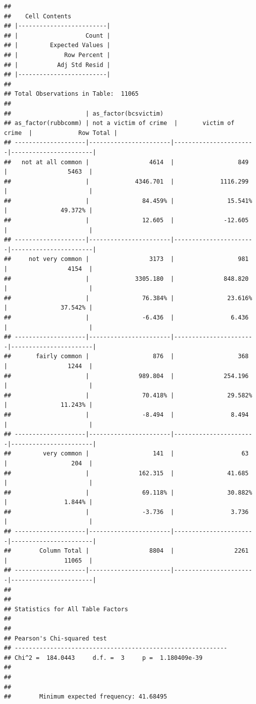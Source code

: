\documentclass[
]{book}
\begin{document}
\begin{verbatim}
## 
##    Cell Contents
## |-------------------------|
## |                   Count |
## |         Expected Values |
## |             Row Percent |
## |           Adj Std Resid |
## |-------------------------|
## 
## Total Observations in Table:  11065 
## 
##                     | as_factor(bcsvictim) 
## as_factor(rubbcomm) | not a victim of crime  |       victim of crime  |             Row Total | 
## --------------------|-----------------------|-----------------------|-----------------------|
##   not at all common |                 4614  |                  849  |                 5463  | 
##                     |             4346.701  |             1116.299  |                       | 
##                     |               84.459% |               15.541% |               49.372% | 
##                     |               12.605  |              -12.605  |                       | 
## --------------------|-----------------------|-----------------------|-----------------------|
##     not very common |                 3173  |                  981  |                 4154  | 
##                     |             3305.180  |              848.820  |                       | 
##                     |               76.384% |               23.616% |               37.542% | 
##                     |               -6.436  |                6.436  |                       | 
## --------------------|-----------------------|-----------------------|-----------------------|
##       fairly common |                  876  |                  368  |                 1244  | 
##                     |              989.804  |              254.196  |                       | 
##                     |               70.418% |               29.582% |               11.243% | 
##                     |               -8.494  |                8.494  |                       | 
## --------------------|-----------------------|-----------------------|-----------------------|
##         very common |                  141  |                   63  |                  204  | 
##                     |              162.315  |               41.685  |                       | 
##                     |               69.118% |               30.882% |                1.844% | 
##                     |               -3.736  |                3.736  |                       | 
## --------------------|-----------------------|-----------------------|-----------------------|
##        Column Total |                 8804  |                 2261  |                11065  | 
## --------------------|-----------------------|-----------------------|-----------------------|
## 
##  
## Statistics for All Table Factors
## 
## 
## Pearson's Chi-squared test 
## ------------------------------------------------------------
## Chi^2 =  184.0443     d.f. =  3     p =  1.180409e-39 
## 
## 
##  
##        Minimum expected frequency: 41.68495
\end{verbatim}
\end{document}
